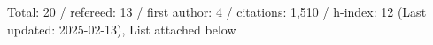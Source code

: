 Total: 20 / refereed: 13 / first author: 4 / citations: 1,510 / h-index: 12 (Last updated: 2025-02-13), List attached below